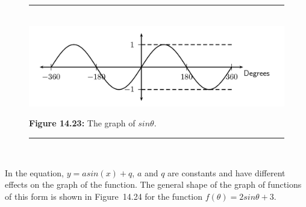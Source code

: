     \setcounter{subfigure}{0}
	\begin{figure}[H] %
    \begin{center}
    \rule[.1in]{\figurerulewidth}{.005in} \\
        \label{m39414*uid31!!!underscore!!!media}\label{m39414*uid31!!!underscore!!!printimage}\includegraphics{col11306.imgs/m39414_MG10C15_017.png} %
      \vspace{2pt}
    \vspace{\rubberspace}\par \begin{cnxcaption}
	  \small \textbf{Figure 14.23: }The graph of $sin\theta $.
	\end{cnxcaption}
    \vspace{.1in}
    \rule[.1in]{\figurerulewidth}{.005in} \\
    \end{center}
 \end{figure}       
      \label{m39414*uid32}
            \nopagebreak
        \label{m39414*id84527}In the equation, $y=asin\left(x\right)+q$, $a$ and $q$ are constants and have different effects on the graph of the function. The general shape of the graph of functions of this form is shown in Figure~14.24 for the function $f\left(\theta \right)=2sin\theta +3$.\par 
    \setcounter{subfigure}{0}
